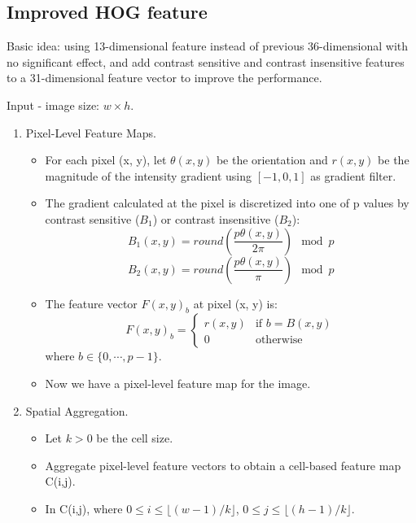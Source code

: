 \documentclass[12pt]{article}
\numberwithin{equation}{section}
\begin{document}
\subsection{Improved HOG feature \cite{felzenszwalb2010object}}
Basic idea: using 13-dimensional feature instead of previous 36-dimensional with no significant effect, and
add  contrast sensitive and contrast insensitive features to a 31-dimensional feature vector to improve the 
performance. \par
Input - image size: $w \times h$.
\begin{enumerate}
	\item Pixel-Level Feature Maps. 
		\begin{itemize}
			\item For each pixel (x, y), let $\theta(x,y)$ be the orientation and $r(x,y)$ be the magnitude of 
			the intensity gradient using $[-1, 0, 1]$ as gradient filter.
			\item The gradient calculated at the pixel is discretized into one of p values by contrast sensitive
			($B_1$) or contrast insensitive ($B_2$):
				\begin{equation}
					B_1(x,y) = round(\frac{p \theta(x,y)}{2 \pi})\mod p 
				\end{equation}
				\begin{equation}
					B_2(x,y) = round(\frac{p \theta(x,y)}{\pi})\mod p
				\end{equation}
			\item The feature vector $F(x, y)_b$ at pixel (x, y) is: 
				\begin{equation}
					F(x,y)_b=
					\begin{cases}
						r(x,y) & \text{if } b = B(x,y) \\
						0 & \text{otherwise}
    					\end{cases}
				\end{equation}
			where $b \in \{0, \cdots , p-1 \}$.
			\item Now we have a pixel-level feature map for the image.
		\end{itemize}
	\item Spatial Aggregation.
		\begin{itemize}
			\item Let $k > 0$ be the cell size.
			\item Aggregate pixel-level feature vectors to obtain a cell-based feature map C(i,j).
			\item In C(i,j), where $0 \le i \le \lfloor{(w-1)/k}\rfloor$, $0 \le j \le \lfloor{(h-1)/k}\rfloor$.

\end{itemize}
\end{enumerate}
\end{document}
